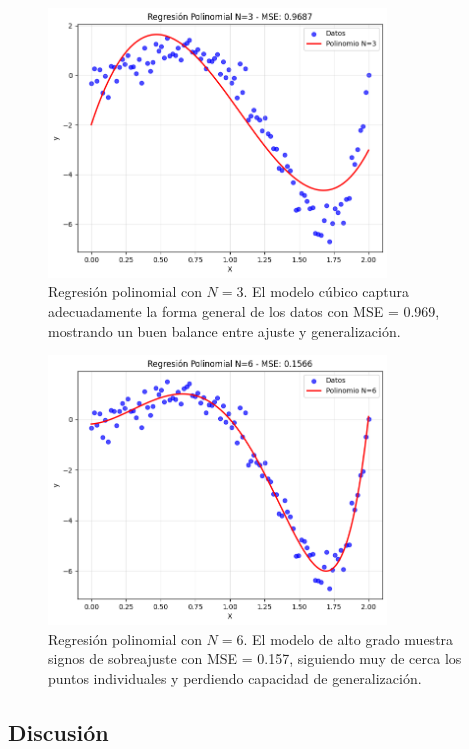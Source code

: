 \documentclass{article}
\begin{document}
\begin{figure}[H]
    \centering
    \includegraphics[width=0.8\textwidth]{images/8_N3.png}
    \caption{Regresión polinomial con $N=3$. El modelo cúbico captura adecuadamente la forma general de los datos con MSE = 0.969, mostrando un buen balance entre ajuste y generalización.}
\end{figure}

\begin{figure}[H]
    \centering
    \includegraphics[width=0.8\textwidth]{images/8_N6.png}
    \caption{Regresión polinomial con $N=6$. El modelo de alto grado muestra signos de sobreajuste con MSE = 0.157, siguiendo muy de cerca los puntos individuales y perdiendo capacidad de generalización.}
\end{figure}

\subsection{Discusión}
\end{document}
